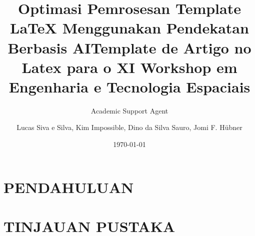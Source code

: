 \documentclass{article}
\title{Optimasi Pemrosesan Template LaTeX Menggunakan Pendekatan Berbasis AI}
\author{Academic Support Agent}
\date{\today}
\begin{document}
\maketitle

\begin{abstract}

\end{abstract}

\chapter{PENDAHULUAN}


\chapter{TINJAUAN PUSTAKA}



\usepackage{template_wete}
\usepackage{ifthen}

\usepackage{graphicx,url}
\usepackage{multirow} %
\usepackage{supertabular} %
\usepackage{tabularx} %
\usepackage{longtable}
\usepackage{gensymb}
\usepackage{color}
\usepackage{fancyhdr}
\usepackage[brazil]{babel}   




\sloppy
\title{Template de Artigo no Latex para o XI Workshop em Engenharia e Tecnologia Espaciais}

\author{Lucas Siva e Silva, Kim Impossible, Dino da Silva Sauro, Jomi F. Hübner }


\address{Instituto Nacional de Pesquisas Espaciais\\
  Aluno de Mestrado do curso de Ciência e Tecnologia de Materiais e Sensores - CMS
\nextinstitute
  Department of Computer Science -- University of Durham\\
  Durham, U.K.
\nextinstitute
  Departamento de Sistemas e Computação\\
  Universidade Regional de Blumenal (FURB) -- Blumenau, SC -- Brazil
}


\renewcommand{\headrulewidth}{0pt}
\renewcommand{\footrulewidth}{0pt}
\fancyhead{}
\fancyfoot{}
\end{document}
